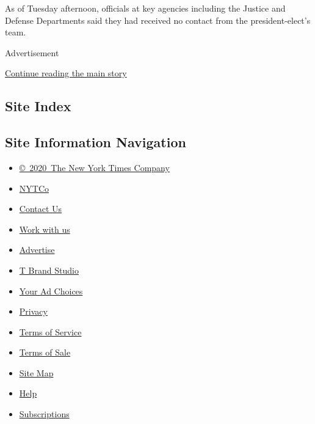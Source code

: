 As of Tuesday afternoon, officials at key agencies including the Justice
and Defense Departments said they had received no contact from the
president-elect's team.

Advertisement

\protect\hyperlink{after-bottom}{Continue reading the main story}

\hypertarget{site-index}{%
\subsection{Site Index}\label{site-index}}

\hypertarget{site-information-navigation}{%
\subsection{Site Information
Navigation}\label{site-information-navigation}}

\begin{itemize}
\tightlist
\item
  \href{https://help.nytimes.com/hc/en-us/articles/115014792127-Copyright-notice}{©~2020~The
  New York Times Company}
\end{itemize}

\begin{itemize}
\tightlist
\item
  \href{https://www.nytco.com/}{NYTCo}
\item
  \href{https://help.nytimes.com/hc/en-us/articles/115015385887-Contact-Us}{Contact
  Us}
\item
  \href{https://www.nytco.com/careers/}{Work with us}
\item
  \href{https://nytmediakit.com/}{Advertise}
\item
  \href{http://www.tbrandstudio.com/}{T Brand Studio}
\item
  \href{https://www.nytimes.com/privacy/cookie-policy\#how-do-i-manage-trackers}{Your
  Ad Choices}
\item
  \href{https://www.nytimes.com/privacy}{Privacy}
\item
  \href{https://help.nytimes.com/hc/en-us/articles/115014893428-Terms-of-service}{Terms
  of Service}
\item
  \href{https://help.nytimes.com/hc/en-us/articles/115014893968-Terms-of-sale}{Terms
  of Sale}
\item
  \href{https://spiderbites.nytimes.com}{Site Map}
\item
  \href{https://help.nytimes.com/hc/en-us}{Help}
\item
  \href{https://www.nytimes.com/subscription?campaignId=37WXW}{Subscriptions}
\end{itemize}
